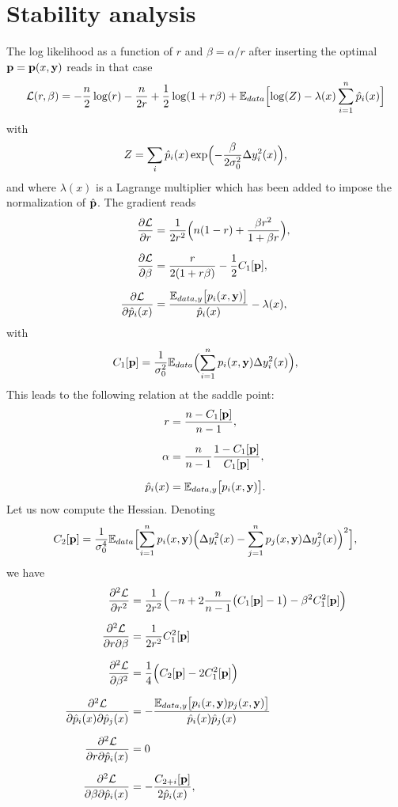 \chapter{Stability analysis}\label{app:Hessian}
The log likelihood as a function of $r$ and $\beta=\alpha/r$ after inserting the optimal
${\bf p} = {\bf p}(x,{\bf y})$ reads in that case
\[
{\cal L}(r,\beta) = -\frac{n}{2}\log(r)-\frac{n}{2r}+\frac{1}{2}\log(1+r\beta)+{\mathbb E}_{data}\Bigl[\log(Z)-\lambda(x)\sum_{i=1}^n \hat p_i(x)\Bigr]
\]
with
\[
Z = \sum_i \hat p_i(x)\exp\Bigl(-\frac{\beta}{2\sigma_0^2}\Delta y_i^2(x)\Bigr),
\]
and where $\lambda(x)$ is a Lagrange multiplier which has been added to impose the normalization of $\hat {\bf p}$.
The gradient reads
\begin{align*}
  \frac{\partial {\cal L}}{\partial r} &= \frac{1}{2r^2}\Bigl(n(1-r)+\frac{\beta r^2}{1+\beta r}\Bigr),\\[0.2cm]
  \frac{\partial {\cal L}}{\partial \beta} &= \frac{r}{2(1+r\beta)}-\frac{1}{2}C_1[{\bf p}],\\[0.2cm]
  \frac{\partial {\cal L}}{\partial \hat p_i(x)} &= \frac{{\mathbb E}_{data,y}\bigl[ p_i(x,\bf y)\bigr]}{\hat p_i(x)}-\lambda(x),
\end{align*}
with
\[
C_1[{\bf p}] = \frac{1}{\sigma_0^2}{\mathbb E}_{data}\Bigl(\sum_{i=1}^n p_i(x,{\bf y})\Delta y_i^2(x)\Bigr),
\]
This leads to the following relation at the saddle point:
\begin{align*}
  r &= \frac{n-C_1[{\bf p}]}{n-1},\\[0.2cm]
  \alpha &= \frac{n}{n-1}\frac{1-C_1[{\bf p}]}{C_1[{\bf p}]},\\[0.2cm]
  \hat p_i(x) &= {\mathbb E}_{data,y}\bigl[ p_i(x,{\bf y})\bigr].
\end{align*}
Let us now compute the Hessian. Denoting
\[
C_2[{\bf p}] = \frac{1}{\sigma_0^4}{\mathbb E}_{data}\Bigl[\sum_{i=1}^n p_i(x,{\bf y})\Bigl(\Delta y_i^2(x)-\sum_{j=1}^np_j(x,{\bf y})\Delta y_j^2(x)\Bigr)^2\Bigr],
\]
we have
\begin{align*}
\frac{\partial^2 {\cal L}}{\partial r^2} &= \frac{1}{2r^2}\Bigl(-n +2\frac{n}{n-1}\bigl(C_1[{\bf p}]-1\bigr)-\beta^2 C_1^2[{\bf p}]\Bigr)\\[0.2cm]
\frac{\partial^2 {\cal L}}{\partial r\partial \beta} &=\frac{1}{2r^2}C_1^2[{\bf p}]\\[0.2cm]
\frac{\partial^2 {\cal L}}{\partial \beta^2} &= \frac{1}{4}\Bigl(C_2[{\bf p}]-2C_1^2[{\bf p}]\Bigr)\\[0.2cm]
\frac{\partial^2 {\cal L}}{\partial \hat p_i(x)\partial\hat p_j(x)}  &= -\frac{{\mathbb E}_{data,y}\bigl[ p_i(x,{\bf y})p_j(x,{\bf y})\bigr]}{\hat p_i(x)\hat p_j(x)}\\[0.2cm]
\frac{\partial^2 {\cal L}}{\partial r\partial\hat p_i(x)} &= 0\\[0.2cm]
\frac{\partial^2 {\cal L}}{\partial \beta\partial\hat p_i(x)} &= -\frac{C_{2+i}[{\bf p}]}{2\hat p_i(x)},
\end{align*}

